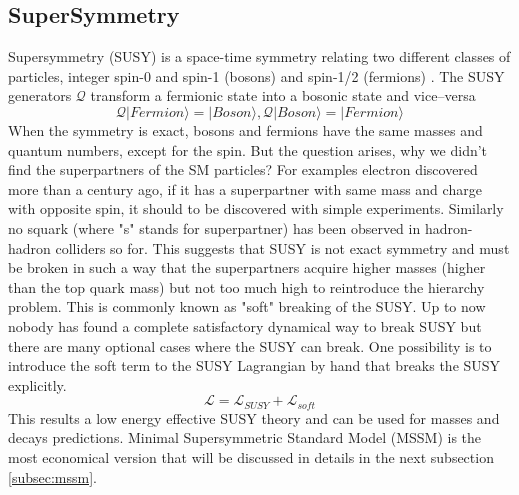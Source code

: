 \subsection{SuperSymmetry}
Supersymmetry (SUSY) is a space-time symmetry relating two different classes of particles, integer spin-0 and spin-1 (bosons) and spin-1/2 (fermions) \cite{phd_thesis:susy}. The SUSY generators $\mathcal{Q}$ transform a fermionic state into a bosonic state and vice–versa
\begin{equation}\label{equ:susy_gen}
\mathcal{Q}|Fermion\rangle = |Boson\rangle, \mathcal{Q}|Boson\rangle = |Fermion\rangle
\end{equation}
When the symmetry is exact, bosons and fermions have the same masses and quantum numbers, except for the spin. But the question arises, why we didn't find the superpartners of the SM particles? For examples electron discovered more than a century ago, if it has a superpartner with same mass and charge with opposite spin, it should to be discovered with simple experiments. Similarly no squark (where "s" stands for superpartner) has been observed in hadron-hadron colliders so for. This suggests that SUSY is not exact symmetry and must be broken in such a way that the superpartners acquire higher masses (higher than the top quark mass) but not too much high to reintroduce the hierarchy problem. This is commonly known as "soft" breaking of the SUSY. Up to now nobody has found a complete satisfactory dynamical way to break SUSY but there are many optional cases where the SUSY can break. One possibility is to introduce the soft term to the SUSY Lagrangian by hand that breaks the SUSY explicitly. 
\begin{equation}\label{equ:soft_break}
\mathcal{L} = \mathcal{L}_{SUSY} + \mathcal{L}_{soft}
\end{equation}
This results a low energy effective SUSY theory and can be used for masses and decays predictions. Minimal Supersymmetric Standard Model (MSSM) is the most economical version that will be discussed in details in the next subsection \ref{subsec:mssm}.   
